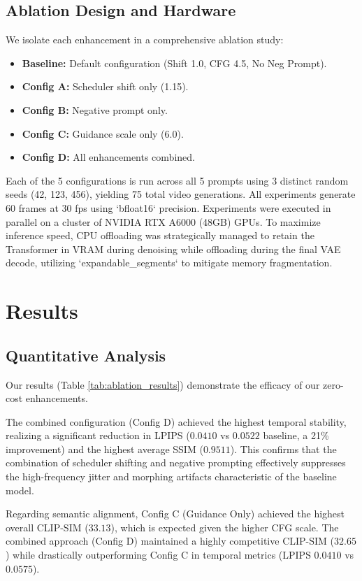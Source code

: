\documentclass[10pt, conference]{IEEEtran}
\begin{document}
\subsection{Ablation Design and Hardware}
We isolate each enhancement in a comprehensive ablation study:
\begin{itemize}
    \item \textbf{Baseline:} Default configuration (Shift 1.0, CFG 4.5, No Neg Prompt).
    \item \textbf{Config A:} Scheduler shift only (1.15).
    \item \textbf{Config B:} Negative prompt only.
    \item \textbf{Config C:} Guidance scale only (6.0).
    \item \textbf{Config D:} All enhancements combined.
\end{itemize}

Each of the 5 configurations is run across all 5 prompts using 3 distinct random seeds (42, 123, 456), yielding 75 total video generations. All experiments generate 60 frames at 30 fps using `bfloat16` precision. Experiments were executed in parallel on a cluster of NVIDIA RTX A6000 (48GB) GPUs. To maximize inference speed, CPU offloading was strategically managed to retain the Transformer in VRAM during denoising while offloading during the final VAE decode, utilizing `expandable_segments` to mitigate memory fragmentation.

\section{Results}

\subsection{Quantitative Analysis}
Our results (Table \ref{tab:ablation_results}) demonstrate the efficacy of our zero-cost enhancements. 

The combined configuration (Config D) achieved the highest temporal stability, realizing a significant reduction in LPIPS ($0.0410$ vs $0.0522$ baseline, a 21\% improvement) and the highest average SSIM ($0.9511$). This confirms that the combination of scheduler shifting and negative prompting effectively suppresses the high-frequency jitter and morphing artifacts characteristic of the baseline model.

Regarding semantic alignment, Config C (Guidance Only) achieved the highest overall CLIP-SIM ($33.13$), which is expected given the higher CFG scale. The combined approach (Config D) maintained a highly competitive CLIP-SIM ($32.65$) while drastically outperforming Config C in temporal metrics (LPIPS $0.0410$ vs $0.0575$).
\end{document}
